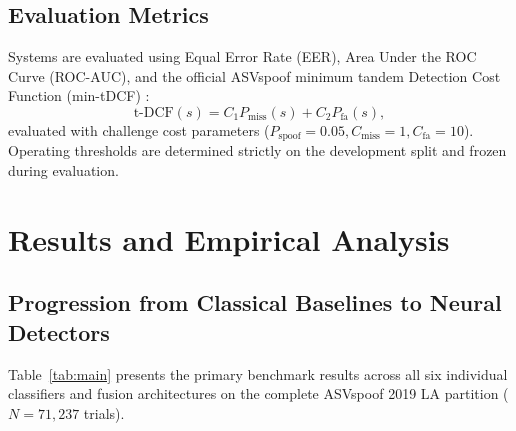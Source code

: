 \documentclass[conference]{IEEEtran}
\begin{document}
\subsection{Evaluation Metrics}
Systems are evaluated using Equal Error Rate (EER), Area Under the ROC Curve (ROC-AUC), and the official ASVspoof minimum tandem Detection Cost Function (min-tDCF) \cite{kinnunen2020tandem}:
\begin{equation}
\text{t-DCF}(s) = C_1 P_{\text{miss}}(s) + C_2 P_{\text{fa}}(s),
\end{equation}
evaluated with challenge cost parameters ($P_{\text{spoof}} = 0.05, C_{\text{miss}} = 1, C_{\text{fa}} = 10$). Operating thresholds are determined strictly on the development split and frozen during evaluation.

\section{Results and Empirical Analysis}

\subsection{Progression from Classical Baselines to Neural Detectors}
Table~\ref{tab:main} presents the primary benchmark results across all six individual classifiers and fusion architectures on the complete ASVspoof 2019 LA partition ($N=71{,}237$ trials).

\begin{table}[htbp]
\caption{Main Results on ASVspoof 2019 LA Partition}
\label{tab:main}
\centering
{}
\end{table}
\end{document}

